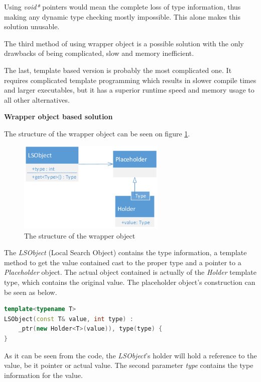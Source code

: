 Using \emph{void*} pointers would mean the complete loss of type information,
thus making any dynamic type checking mostly impossible. This alone makes this
solution unusable.

The third method of using wrapper object is a possible solution with the
only drawbacks of being complicated, slow and memory inefficient.

The last, template based version is probably the most complicated one. It
requires complicated template programming which results in slower compile times
and larger executables, but it has a superior runtime speed and memory usage to
all other alternatives.

\textbf{Wrapper object based solution}

 The structure of the wrapper object can be seen on figure
 \ref{fig:wrapper_structure}.

\begin{figure}[!ht]
\centering
\includegraphics[width=70mm, keepaspectratio]{figures/wrapper_structure.png}
\caption{The structure of the wrapper object}
\label{fig:wrapper_structure}
\end{figure}

The \emph{LSObject} (Local Search Object) contains the type information, a
template method to get the value contained cast to the proper type and a pointer to a
\emph{Placeholder} object. The actual object contained is actually of the
\emph{Holder} template type, which contains the original value. The placeholder
object's construction can be seen as below.

\begin{lstlisting}[frame=single,float=!ht,language=C++, caption=Constructing a
wrapper object] template<typename T>
LSObject(const T& value, int type) :
	_ptr(new Holder<T>(value)), type(type) {
}
\end{lstlisting}

As it can be seen from the code, the \emph{LSObject}'s holder will hold a
reference to the value, be it pointer or actual value. The second parameter
\emph{type} contains the type information for the value. 

